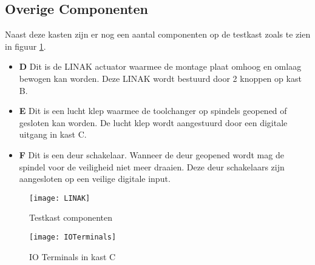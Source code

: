 \newpage

\subsection{Overige Componenten}

Naast deze kasten zijn er nog een aantal componenten op de testkast zoals te zien in figuur \ref{fig:LINAK}.

\begin{itemize}
	\item \textbf{D} Dit is de LINAK actuator waarmee de montage plaat omhoog en omlaag bewogen kan worden. Deze LINAK wordt bestuurd door 2 knoppen op kast B.
	\item \textbf{E} Dit is een lucht klep waarmee de toolchanger op spindels geopened of gesloten kan worden. De lucht klep wordt aangestuurd door een digitale uitgang in kast C.
	\item \textbf{F} Dit is een deur schakelaar. Wanneer de deur geopened wordt mag de spindel voor de veiligheid niet meer draaien. Deze deur schakelaars zijn aangesloten op een veilige digitale input.
\end{itemize}

\begin{figure}[H]
	\centering
	\texttt{[image: LINAK]}
	\label{fig:LINAK}
	\caption{Testkast componenten}
\end{figure}

\begin{figure}[H]
	\centering
	\texttt{[image: IOTerminals]}
	\label{fig:IOTerminals}
	\caption{IO Terminals in kast C}
\end{figure}